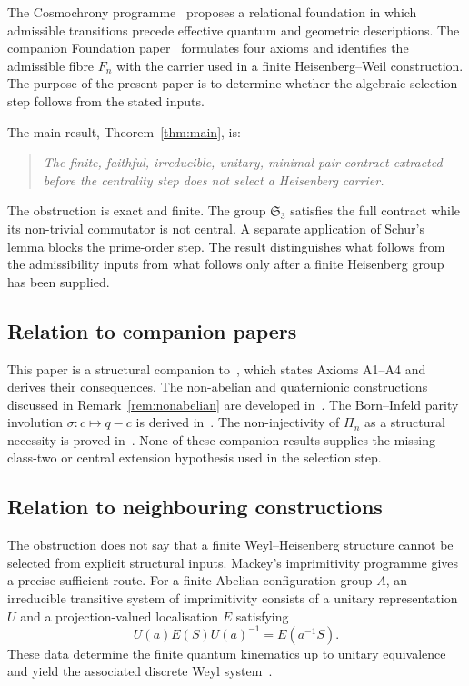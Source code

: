 \documentclass[11pt,a4paper]{article}
\newcommand{\Sym}{\mathfrak{S}}
\begin{document}
  The Cosmochrony programme~\cite{Cosmochrony} proposes a relational foundation
  in which admissible transitions precede effective quantum and geometric
  descriptions.
  The companion Foundation paper~\cite{Foundation} formulates four axioms and
  identifies the admissible fibre $F_n$ with the carrier used in a finite
  Heisenberg--Weil construction.
  The purpose of the present paper is to determine whether the algebraic
  selection step follows from the stated inputs.

  The main result, Theorem~\ref{thm:main}, is:

  \begin{quote}
    \textit{The finite, faithful, irreducible, unitary, minimal-pair contract
    extracted before the centrality step does not select a Heisenberg carrier.}
  \end{quote}

  \noindent
  The obstruction is exact and finite.
  The group $\Sym_3$ satisfies the full contract while its non-trivial
  commutator is not central.
  A separate application of Schur's lemma blocks the prime-order step.
  The result distinguishes what follows from the admissibility inputs from what
  follows only after a finite Heisenberg group has been supplied.

  \subsection*{Relation to companion papers}

    This paper is a structural companion to~\cite{Foundation}, which states
    Axioms A1--A4 and derives their consequences.
    The non-abelian and quaternionic constructions discussed in
    Remark~\ref{rem:nonabelian} are developed in~\cite{O23}.
    The Born--Infeld parity involution $\sigma\colon c \mapsto q - c$ is derived
    in~\cite{BornInfeld}.
    The non-injectivity of $\Pi_n$ as a structural necessity is proved
    in~\cite{ENI}.
    None of these companion results supplies the missing class-two or central
    extension hypothesis used in the selection step.

  \subsection{Relation to neighbouring constructions}
  \label{sec:neighbouring}

    The obstruction does not say that a finite Weyl--Heisenberg structure cannot
    be selected from explicit structural inputs.
    Mackey's imprimitivity programme gives a precise sufficient route.
    For a finite Abelian configuration group $A$, an irreducible transitive
    system of imprimitivity consists of a unitary representation $U$ and a
    projection-valued localisation $E$ satisfying
    \[
      U(a)E(S)U(a)^{-1}=E(a^{-1}S).
    \]
    These data determine the finite quantum kinematics up to unitary equivalence
    and yield the associated discrete Weyl system~\cite{StovicekTolar1984,Tolar2014}.
\end{document}
